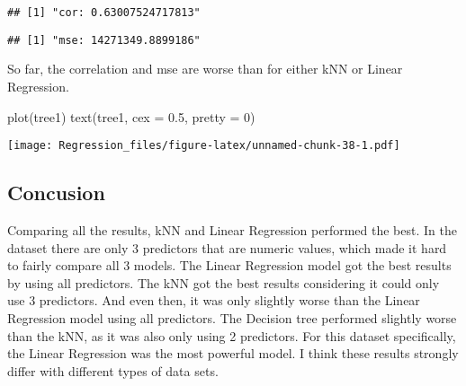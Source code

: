 \documentclass[
]{article}
\newenvironment{Shaded}{\begin{snugshade}}{\end{snugshade}}
\newcommand{\AttributeTok}[1]{\textcolor[rgb]{0.77,0.63,0.00}{#1}}
\newcommand{\DecValTok}[1]{\textcolor[rgb]{0.00,0.00,0.81}{#1}}
\newcommand{\FloatTok}[1]{\textcolor[rgb]{0.00,0.00,0.81}{#1}}
\newcommand{\FunctionTok}[1]{\textcolor[rgb]{0.00,0.00,0.00}{#1}}
\newcommand{\NormalTok}[1]{#1}
\newcommand{\OtherTok}[1]{\textcolor[rgb]{0.56,0.35,0.01}{#1}}
\newcommand{\SpecialCharTok}[1]{\textcolor[rgb]{0.00,0.00,0.00}{#1}}
\newcommand{\StringTok}[1]{\textcolor[rgb]{0.31,0.60,0.02}{#1}}
\begin{document}
\begin{verbatim}
## [1] "cor: 0.63007524717813"
\end{verbatim}

\begin{Shaded}
\end{Shaded}

\begin{verbatim}
## [1] "mse: 14271349.8899186"
\end{verbatim}

So far, the correlation and mse are worse than for either kNN or Linear
Regression.

\begin{Shaded}
\begin{Highlighting}[]
\FunctionTok{plot}\NormalTok{(tree1)}
\FunctionTok{text}\NormalTok{(tree1, }\AttributeTok{cex =} \FloatTok{0.5}\NormalTok{, }\AttributeTok{pretty =} \DecValTok{0}\NormalTok{)}
\end{Highlighting}
\end{Shaded}

\texttt{[image: Regression\_files/figure-latex/unnamed-chunk-38-1.pdf]}

\hypertarget{concusion}{%
\subsection{Concusion}\label{concusion}}

Comparing all the results, kNN and Linear Regression performed the best.
In the dataset there are only 3 predictors that are numeric values,
which made it hard to fairly compare all 3 models. The Linear Regression
model got the best results by using all predictors. The kNN got the best
results considering it could only use 3 predictors. And even then, it
was only slightly worse than the Linear Regression model using all
predictors. The Decision tree performed slightly worse than the kNN, as
it was also only using 2 predictors. For this dataset specifically, the
Linear Regression was the most powerful model. I think these results
strongly differ with different types of data sets.
\end{document}
